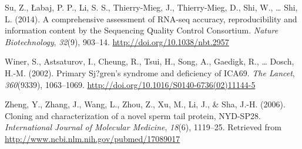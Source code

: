 \documentclass[12pt,twoside]{reedthesis}
\theoremstyle{definition}
\theoremstyle{definition}
\theoremstyle{remark}
\begin{document}
  \hypertarget{ref-Su2014}{}
  Su, Z., Łabaj, P. P., Li, S. S., Thierry-Mieg, J., Thierry-Mieg, D.,
  Shi, W., \ldots{} Shi, L. (2014). A comprehensive assessment of RNA-seq
  accuracy, reproducibility and information content by the Sequencing
  Quality Control Consortium. \emph{Nature Biotechnology}, \emph{32}(9),
  903--14. \url{http://doi.org/10.1038/nbt.2957}
  
  \hypertarget{ref-Winer2002}{}
  Winer, S., Astsaturov, I., Cheung, R., Tsui, H., Song, A., Gaedigk, R.,
  \ldots{} Dosch, H.-M. (2002). Primary Sj?gren's syndrome and deficiency
  of ICA69. \emph{The Lancet}, \emph{360}(9339), 1063--1069.
  \url{http://doi.org/10.1016/S0140-6736(02)11144-5}
  
  \hypertarget{ref-Zheng2006}{}
  Zheng, Y., Zhang, J., Wang, L., Zhou, Z., Xu, M., Li, J., \& Sha, J.-H.
  (2006). Cloning and characterization of a novel sperm tail protein,
  NYD-SP28. \emph{International Journal of Molecular Medicine},
  \emph{18}(6), 1119--25. Retrieved from
  \url{http://www.ncbi.nlm.nih.gov/pubmed/17089017}


\end{document}
